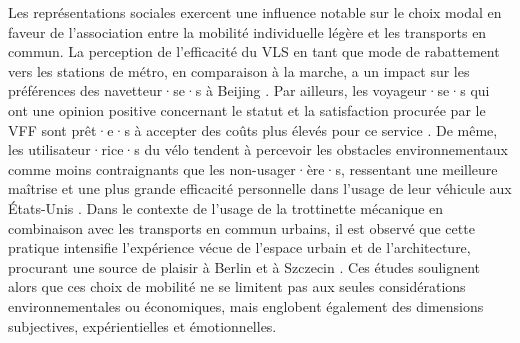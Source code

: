 \begin{refsegment}
Les représentations sociales exercent une influence notable sur le choix modal en faveur de l'association entre la mobilité individuelle légère et les transports en commun. La perception de l'efficacité du \acrshort{VLS} en tant que mode de rabattement vers les stations de métro, en comparaison à la marche, a un impact sur les préférences des navetteur·se·s à Beijing \textcolor{blue}{\autocite[7]{zhao_public_2022}}. Par ailleurs, les voyageur·se·s qui ont une opinion positive concernant le statut et la satisfaction procurée par le \acrshort{VFF} sont prêt·e·s à accepter des coûts plus élevés pour ce service \textcolor{blue}{\autocite[10]{guo_exploring_2023}}. De même, les utilisateur·rice·s du vélo tendent à percevoir les obstacles environnementaux comme moins contraignants que les non-usager·ère·s, ressentant une meilleure maîtrise et une plus grande efficacité personnelle dans l'usage de leur véhicule aux États-Unis \textcolor{blue}{\autocite[4~267]{bopp_examining_2015}}. Dans le contexte de l'usage de la trottinette mécanique en combinaison avec les transports en commun urbains, il est observé que cette pratique intensifie l'expérience vécue de l'espace urbain et de l'architecture, procurant une source de plaisir à Berlin et à Szczecin \textcolor{blue}{\autocite[7]{kostrzewska_towards_2017}}. Ces études soulignent alors que ces choix de mobilité ne se limitent pas aux seules considérations environnementales ou économiques, mais englobent également des dimensions subjectives, expérientielles et émotionnelles.%


\end{refsegment}
